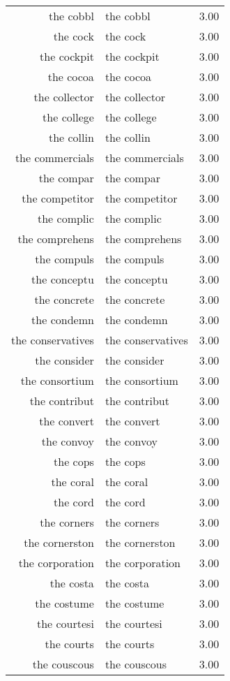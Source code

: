 \begin{table}[ht]
\begin{tabular}{rlr}
  the cobbl & the cobbl & 3.00 \\ 
  the cock & the cock & 3.00 \\ 
  the cockpit & the cockpit & 3.00 \\ 
  the cocoa & the cocoa & 3.00 \\ 
  the collector & the collector & 3.00 \\ 
  the college & the college & 3.00 \\ 
  the collin & the collin & 3.00 \\ 
  the commercials & the commercials & 3.00 \\ 
  the compar & the compar & 3.00 \\ 
  the competitor & the competitor & 3.00 \\ 
  the complic & the complic & 3.00 \\ 
  the comprehens & the comprehens & 3.00 \\ 
  the compuls & the compuls & 3.00 \\ 
  the conceptu & the conceptu & 3.00 \\ 
  the concrete & the concrete & 3.00 \\ 
  the condemn & the condemn & 3.00 \\ 
  the conservatives & the conservatives & 3.00 \\ 
  the consider & the consider & 3.00 \\ 
  the consortium & the consortium & 3.00 \\ 
  the contribut & the contribut & 3.00 \\ 
  the convert & the convert & 3.00 \\ 
  the convoy & the convoy & 3.00 \\ 
  the cops & the cops & 3.00 \\ 
  the coral & the coral & 3.00 \\ 
  the cord & the cord & 3.00 \\ 
  the corners & the corners & 3.00 \\ 
  the cornerston & the cornerston & 3.00 \\ 
  the corporation & the corporation & 3.00 \\ 
  the costa & the costa & 3.00 \\ 
  the costume & the costume & 3.00 \\ 
  the courtesi & the courtesi & 3.00 \\ 
  the courts & the courts & 3.00 \\ 
  the couscous & the couscous & 3.00 \\ 

\end{tabular}
\end{table}
